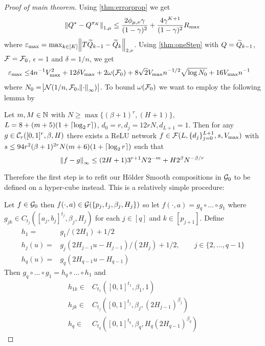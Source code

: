 




\begin{proof}[Proof of main theorem] %
  Using \cref{thm:errorprop} we get
  \begin{equation}
    \norm{Q^* - Q^{\pi_K}}_{1,\mu} \leq
    \frac{2 \phi_{\mu, \nu} \gamma}{(1-\gamma)^2} +
    \frac{4 \gamma^{K+1}}{(1-\gamma)^2} R_{\max}
    \label{eq:mp1}
  \end{equation}
  where $\varepsilon_{\max} =
  \max_{k \in [K]} \norm{T \widetilde{Q}_{k-1} - \widetilde{Q}_k}_{2, \nu}$.
  Using \cref{thm:oneStep} with $Q = \widetilde{Q}_{k-1}$, 
  $\mathcal{F} = \mathcal{F}_0$, $\epsilon = 1$ and $\delta = 1/n$, we get 
  \begin{align}
    \varepsilon_{\max} \leq & 4 n^{-1} V_{\max}^2
    + 12 \delta V_{\max}
    + 2 \omega(\mathcal{F}_0)
    + 8 \sqrt{2} V_{\max} n^{-1/2} \sqrt{\log N_0}
    + 16 V_{\max} n^{-1}
    \label{eq:mp2}
  \end{align}
  where $N_0 = \abs{\mathcal{N}(1/n, \mathcal{F}_0, \norm{\cdot}_\infty)}$.
  To bound $\omega(\mathcal{F}_0)$
  we want to employ the following lemma by %
  \begin{lem}
    Let $m,M \in \mathbb{N}$ with $N\geq \max\{(\beta + 1)^r, (H+1)\}$,
    $L = 8 + (m + 5) (1 + \lceil\log_2 r\rceil)$, 
    $d_0 = r, d_j = 12 r N, d_{L+1} = 1$.
    Then for any $g \in \mathcal{C}_r([0,1]^r, \beta, H)$
    there exists a ReLU network
    $f \in \mathcal{F}(L, \{d_j\}_{j=0}^{L+1}, s, V_{\max})$
    with $s \leq 94 r^2 (\beta + 1)^{2r} N (m+6)(1+\lceil\log_2 r\rceil)$
    such that
    \begin{equation*}
      \norm{f - g}_\infty \leq (2 H + 1) 3^{r+1} N 2^{-m} + H 2^\beta N^{-\beta/r}
    \end{equation*}
  \end{lem} 
  Therefore the first step is to refit our
  Hölder Smooth compositions in $\mathcal{G}_0$ to be defined on a hyper-cube instead.
  This is a relatively simple procedure:

  Let $f \in \mathcal{G}_0$ then $f(\cdot, a) \in
  \mathcal{G}(\{p_j, t_j, \beta_j, H_j\})$
  so let $f(\cdot, a) = g_q \circ \dots \circ g_1$ where
  $g_{jk} \in C_{t_j}([a_j, b_j]^{t_j}, \beta_j, H_j)$
  for each $j \in [q]$ and $k \in [p_{j+1}]$.
  Define
  \begin{align}
    h_1 = & g_1/(2H_1) + 1/2
    \\ h_j(u) = & g_j(2H_{j-1} u - H_{j-1})/(2H_j) + 1/2,
    \qquad j \in \{2, \dots, q-1\}
    \\ h_q(u) = & g_q(2H_{q-1}u - H_{q-1})
  \end{align}
  Then $g_q \circ \dots \circ g_1 = h_q \circ \dots \circ h_1$ and
  \begin{align}
    h_{1k} \in & C_{t_1}([0,1]^{t_1}, \beta_1, 1)
    \\ h_{jk} \in & C_{t_j}([0,1]^{t_j}, \beta_j, (2H_{j-1})^{\beta_j})
    \\ h_q \in & C_{t_q}([0,1]^{t_q}, \beta_q, H_q(2H_{q-1})^{\beta_q})
  \end{align}



\end{proof}
